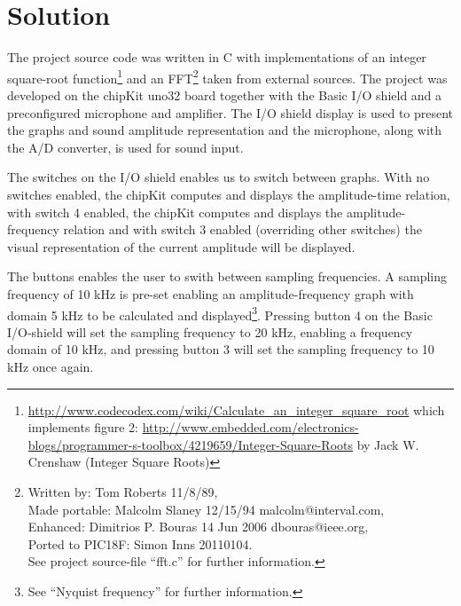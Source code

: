 \documentclass[a4paper,11pt]{article}
\begin{document}
\section*{Solution}
The project source code was written in C with implementations of an integer square-root function\footnote{\url{http://www.codecodex.com/wiki/Calculate_an_integer_square_root} which implements figure 2: \url{http://www.embedded.com/electronics-blogs/programmer-s-toolbox/4219659/Integer-Square-Roots} by Jack W. Crenshaw (Integer Square Roots)} 
and an FFT\footnote{Written by:  Tom Roberts  11/8/89, \\Made portable:  Malcolm Slaney 12/15/94 malcolm@interval.com, \\Enhanced:  Dimitrios P. Bouras  14 Jun 2006 dbouras@ieee.org, \\Ported to PIC18F:  Simon Inns 20110104.\\ See project source-file ``fft.c'' for further information.} 
taken from external sources. The project was developed on the chipKit uno32 board together with the Basic I/O shield and a preconfigured microphone and amplifier. The I/O shield display is used to present the graphs and sound amplitude representation and the microphone, along with the A/D converter, is used for sound input. 

The switches on the I/O shield enables us to switch between graphs. With no switches enabled, the chipKit computes and displays the amplitude-time relation, with switch 4 enabled, the chipKit computes and displays the amplitude-frequency relation and with switch 3 enabled (overriding other switches) the visual representation of the current amplitude will be displayed.

The buttons enables the user to swith between sampling frequencies. A sampling frequency of 10 kHz is pre-set enabling an amplitude-frequency graph with domain 5 kHz to be calculated and displayed\footnote{See ``Nyquist frequency'' for further information.}. Pressing button 4 on the Basic I/O-shield will set the sampling frequency to 20 kHz, enabling a frequency domain of 10 kHz, and pressing button 3 will set the sampling frequency to 10 kHz once again.
\end{document}
